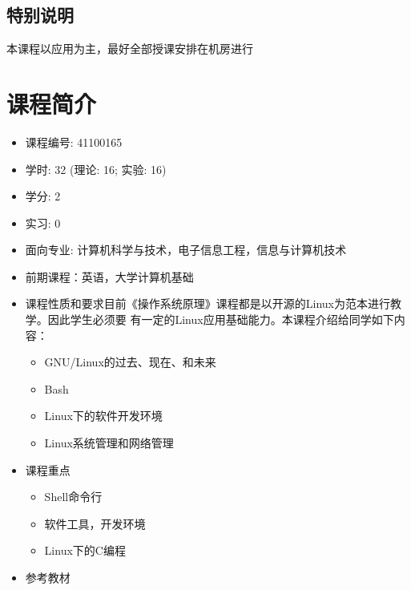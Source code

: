 \documentclass{wx672ctexart}
\begin{document}
\nocite{cooper10bash,web:debianhandbook}
\printbibliography[heading=none]{}


\subsection{特别说明}
本课程以应用为主，最好全部授课安排在机房进行


\section{课程简介}

\begin{itemize}
\item 课程编号: 41100165
\item 学时: 32 (理论: 16; 实验: 16)
\item 学分: 2
\item 实习: 0
\item 面向专业: 计算机科学与技术，电子信息工程，信息与计算机技术
\item 前期课程：英语，大学计算机基础
\item 课程性质和要求目前《操作系统原理》课程都是以开源的Linux为范本进行教学。因此学生必须要
  有一定的Linux应用基础能力。本课程介绍给同学如下内容：
  \begin{itemize}
  \item GNU/Linux的过去、现在、和未来
  \item Bash
  \item Linux下的软件开发环境
  \item Linux系统管理和网络管理
  \end{itemize}
\item 课程重点
  \begin{itemize}
  \item Shell命令行
  \item 软件工具，开发环境
  \item Linux下的C编程
  \end{itemize}
\item 参考教材\hfill \nocite{cooper10bash,web:debianhandbook}
  \printbibliography[heading=none]{}
\end{itemize}
\end{document}

